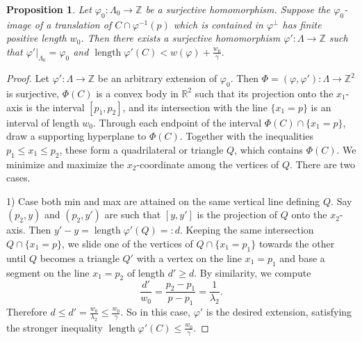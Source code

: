 \documentclass[12pt,twoside]{amsart}
\newcommand{\Z}{{\mathbb Z}}
\newcommand{\R}{{\mathbb R}}
\newcommand{\length}{\operatorname{length}}
\theoremstyle{plain}
\newtheorem{prop}[thm]{Proposition}
\theoremstyle{definition}
\theoremstyle{remark}
\begin{document}
\begin{prop}\label{lfb}
	Let $\varphi_0\colon \Lambda_0\to \Z$ be a surjective homomorphism.
	Suppose the $\varphi_0$-image of a translation of $C \cap\varphi^{-1}(p)$ which is contained in $\varphi^\perp$
	has finite positive length $w_0$. Then there exists
	a surjective homomorphism $\varphi'\colon \Lambda\to \Z$ such that $\varphi'|_{\Lambda_0}=\varphi_0$
	and 
	$
	\length \varphi'(C)<w(\varphi)+\frac{w_0}{\gamma}.
	$
\end{prop}

\begin{proof}
	Let $\varphi'\colon \Lambda\to \Z$ be an arbitrary extension of $\varphi_0$. Then 
	$\Phi=(\varphi,\varphi')\colon \Lambda\to \Z^2$ is surjective, $\Phi(C)$ is
	a convex body in $\R^2$ such that its projection onto the $x_1$-axis is the interval $[p_1,p_2]$, and its intersection with the line $\{x_1=p\}$ is an interval of length $w_0$. Through each endpoint of the interval $\Phi(C)\cap \{x_1=p\}$, draw a supporting hyperplane to $\Phi(C)$. Together with the inequalities $p_1 \le x_1 
	\le p_2$, these form a quadrilateral or triangle $Q$, which contains $\Phi(C)$. We minimize and maximize the $x_2$-coordinate among the vertices of $Q$. There are two cases.
	
	1) Case both min and max are attained on the same vertical line defining $Q$. Say $(p_2,y)$ and $(p_2,y')$ are such that $[y,y']$ is the projection of $Q$ onto the $x_2$-axis. Then $y'-y=\length  \varphi'(Q)=:d$. Keeping the same intersection $Q\cap \{x_1=p\}$, we slide one of the vertices of $Q\cap\{x_1=p_1\}$ towards the other until $Q$ becomes a triangle $Q'$ with a vertex on the line $x_1=p_1$ and base a segment on the line $x_1=p_2$ of length $d'\ge d$. By similarity, we compute
	$$
	\frac{d'}{w_0}=\frac{p_2-p_1}{p-p_1}=\frac{1}{\lambda_2}.
	$$
	Therefore $d\le d'=\frac{w_0}{\lambda_2}\le \frac{w_0}{\gamma}$. So in this case, $\varphi'$ is the desired extension, satisfying the stronger inequality 
	$
	\length \varphi'(C) \le \frac{w_0}{\gamma}.
	$
	

\end{proof}
\end{document}
